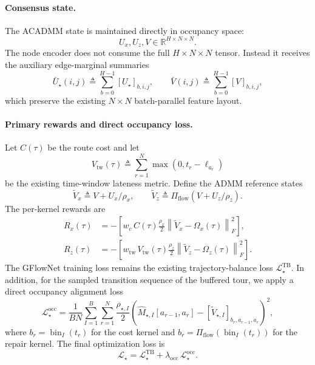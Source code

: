 \paragraph{Consensus state.}
The ACADMM state is maintained directly in occupancy space:
\[
U_x,U_z,V \in \mathbb{R}^{H\times N\times N}.
\]
The node encoder does not consume the full $H\times N\times N$ tensor. Instead it receives the auxiliary edge-marginal summaries
\[
\bar U_\star(i,j) \triangleq \sum_{b=0}^{H-1} [U_\star]_{b,i,j},\qquad
\bar V(i,j) \triangleq \sum_{b=0}^{H-1} [V]_{b,i,j},
\]
which preserve the existing $N\times N$ batch-parallel feature layout.

\paragraph{Primary rewards and direct occupancy loss.}
Let $C(\tau)$ be the route cost and let
\[
V_{\mathrm{tw}}(\tau) \triangleq \sum_{r=1}^{N} \max(0,t_r-\ell_{a_r})
\]
be the existing time-window lateness metric. Define the ADMM reference states
\[
\widetilde V_x \triangleq V + U_x/\rho_x,\qquad
\widetilde V_z \triangleq \Pi_{\mathrm{flow}}\!\left(V + U_z/\rho_z\right).
\]
The per-kernel rewards are
\begin{align}
R_x(\tau)
&=
-\left[
w_c\,C(\tau)
\frac{\rho_x}{2}\left\|\widetilde V_x-\Omega_x(\tau)\right\|_F^2
\right],\\
R_z(\tau)
&=
-\left[
w_{\mathrm{tw}}\,V_{\mathrm{tw}}(\tau)
\frac{\rho_z}{2}\left\|\widetilde V_z-\Omega_z(\tau)\right\|_F^2
\right].
\end{align}
The GFlowNet training loss remains the existing trajectory-balance loss $\mathcal{L}^{\mathrm{TB}}_\star$. In addition, for the sampled transition sequence of the buffered tour, we apply a direct occupancy alignment loss
\[
\mathcal{L}^{\mathrm{occ}}_\star

=
\frac{1}{BN}
\sum_{I=1}^{B}
\sum_{r=1}^{N}
\frac{\rho_{\star,I}}{2}
\left(
\widehat M_{\star,I}[a_{r-1},a_r]
-
[\widetilde V_{\star,I}]_{b_r,a_{r-1},a_r}
\right)^2 ,
\]
where $b_r=\operatorname{bin}_I(t_r)$ for the cost kernel and $b_r=\Pi_{\mathrm{flow}}(\operatorname{bin}_I(t_r))$ for the repair kernel. The final optimization loss is
\[
\mathcal{L}_\star = \mathcal{L}^{\mathrm{TB}}_\star + \lambda_{\mathrm{occ}}\,\mathcal{L}^{\mathrm{occ}}_\star.
\]

